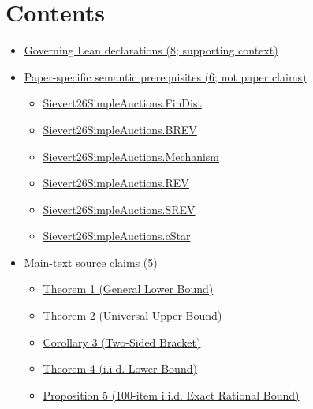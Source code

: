 \documentclass[10pt]{article}
\begin{document}
\section*{Contents}
\begin{itemize}[leftmargin=1.2em]
\item \hyperlink{governing-declaration-section-5ef5ef0364b6939c}{Governing Lean declarations (8; supporting context)}
\item \hyperlink{paper-prerequisite-section-5ef5ef0364b6939c}{Paper-specific semantic prerequisites (6; not paper claims)}
\begin{itemize}[leftmargin=1.2em]
\item \hyperlink{paper-prerequisite-5b39ea21863ce14e}{Sievert26\allowbreak{}Simple\allowbreak{}Auctions.\allowbreak{}Fin\allowbreak{}Dist}
\item \hyperlink{paper-prerequisite-e0c4e0f254386cff}{Sievert26\allowbreak{}Simple\allowbreak{}Auctions.\allowbreak{}BREV}
\item \hyperlink{paper-prerequisite-b1d558d0810cbb0e}{Sievert26\allowbreak{}Simple\allowbreak{}Auctions.\allowbreak{}Mechanism}
\item \hyperlink{paper-prerequisite-8bbfb5082359244f}{Sievert26\allowbreak{}Simple\allowbreak{}Auctions.\allowbreak{}REV}
\item \hyperlink{paper-prerequisite-de82ecb4c67c171b}{Sievert26\allowbreak{}Simple\allowbreak{}Auctions.\allowbreak{}SREV}
\item \hyperlink{paper-prerequisite-3b350509c2b8610a}{Sievert26\allowbreak{}Simple\allowbreak{}Auctions.\allowbreak{}c\allowbreak{}Star}
\end{itemize}
\item \hyperlink{source-section-0c7af8265958a9ea}{Main-text source claims (5)}
\begin{itemize}[leftmargin=1.2em]
\item \hyperlink{source-claim-c62d7224d99f5065}{Theorem 1 (General Lower Bound)}
\item \hyperlink{source-claim-ee93e38fd4716dbe}{Theorem 2 (Universal Upper Bound)}
\item \hyperlink{source-claim-1868c4adbd598c22}{Corollary 3 (Two-Sided Bracket)}
\item \hyperlink{source-claim-401774aa30d66b30}{Theorem 4 (i.\allowbreak{}i.\allowbreak{}d.\allowbreak{} Lower Bound)}
\item \hyperlink{source-claim-0e5826d998ecffab}{Proposition 5 (100-item i.\allowbreak{}i.\allowbreak{}d.\allowbreak{} Exact Rational Bound)}
\end{itemize}
\end{itemize}
\end{document}
